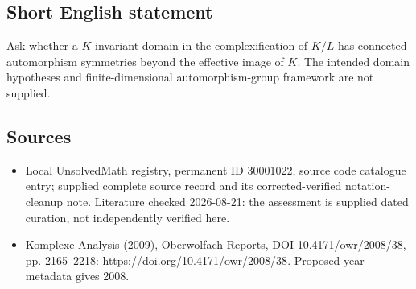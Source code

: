 \documentclass[11pt]{article}
\begin{document}
\subsection{Short English statement}
Ask whether a $K$-invariant domain in the complexification of $K/L$ has connected automorphism symmetries beyond the effective image of $K$. The intended domain hypotheses and finite-dimensional automorphism-group framework are not supplied.
\subsection{Sources}
\begin{itemize}
\item Local UnsolvedMath registry, permanent ID 30001022, source code catalogue entry; supplied complete source record and its corrected-verified notation-cleanup note. Literature checked 2026-08-21: the assessment is supplied dated curation, not independently verified here.
\item Komplexe Analysis (2009), Oberwolfach Reports, DOI 10.4171/owr/2008/38, pp. 2165--2218: \url{https://doi.org/10.4171/owr/2008/38}. Proposed-year metadata gives 2008.
\end{itemize}
\end{document}
